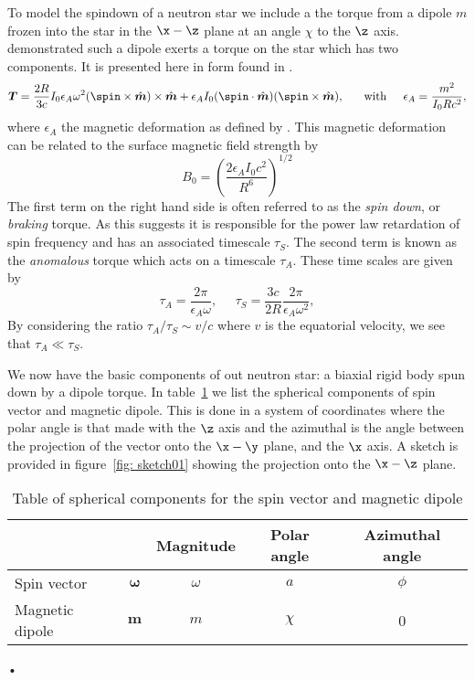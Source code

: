 \documentclass[/home/greg/Thesis/main/main.tex]{subfiles}
\begin{document}
To model the spindown of a neutron star we include a the torque from a dipole
$m$ frozen into the star in the $\x-\z$ plane at an angle $\chi$ to the $\z$
axis. \citet{Deutsch1955} demonstrated such a dipole exerts a torque on the
star which has two components. It is presented here in form found in
\citet[hereafter G70]{Goldreich1970}.
\begin{equation}
\boldsymbol{T}=\frac{2R}{3c} I_{0}\epsilon_{A}\omega^{2}
               (\spin \times \hat{\boldsymbol{m}})\times \hat{\boldsymbol{m}} 
               + \epsilon_{A}I_{0}(\spin \cdot \hat{\boldsymbol{m}})
               (\spin \times \hat{\boldsymbol{m}}), \;\;\;\;\; \textrm{ with } 
               \;\;\;\; \epsilon_{A} = \frac{m^{2}}{I_{0}R c^{2}},
\label{eqn: torque}
\end{equation}
where $\epsilon_{A}$ the magnetic deformation as defined by \citet{Glampedakis2010}.
This magnetic deformation can be related to the surface magnetic field strength
by 
\begin{equation}
    B_{0} = \left(\frac{2 \epsilon_{A} I_{0} c^{2}}{R^{6}}\right)^{1/2}
    \label{eqn: magnetic field epsA}
\end{equation}
The first term on the right hand side is often referred to as the \emph{spin
down}, or \emph{braking} torque. As this suggests it is responsible for the
power law retardation of spin frequency and has an associated timescale
$\tau_{S}$. The second term is known as the \emph{anomalous} torque which acts
on a timescale $\tau_{A}$. These time scales are given by 
\begin{equation}
\tau_{A}=\frac{2\pi}{\epsilon_{A}\omega},  \;\;\;\;\; 
\tau_{S}=\frac{3c}{2R}\frac{2\pi}{\epsilon_{A}\omega^{2}},
\label{eqn: torque timescales}
\end{equation}
By considering the ratio $\tau_{A}/\tau_{S} \sim v/c$ where $v$ is the equatorial
velocity, we see that $\tau_{A} \ll \tau_{S}$. 

We now have the basic components of out neutron star: a biaxial rigid body 
spun down by a dipole torque. In table~\ref{tab: definitions} we list the
spherical components of spin vector and magnetic dipole. This is done in a system
of coordinates where the polar angle is that made with the $\z$ axis and the 
azimuthal is the angle between the projection of the vector onto the $\x-\y$ 
plane, and the $\x$ axis. A sketch is provided in figure~\ref{fig: sketch01}
showing the projection onto the $\x-\z$ plane.

\begin{table}[ht]
\centering
\begin{tabular}{|l|c|c|c|c|} \hline
 \multicolumn{2}{|c|}{} & Magnitude & Polar angle & Azimuthal angle \\ \hline
Spin vector  & $\boldsymbol{\omega}$ & $\omega$ & $a$ & $\phi$ \\ \hline
Magnetic dipole &  $\boldsymbol{m}$ & $m$ & $\chi$ & 0 \\ \hline
\end{tabular}•
\caption{Table of spherical components for the spin vector and magnetic dipole}
\label{tab: definitions}
\end{table}
\end{document}
